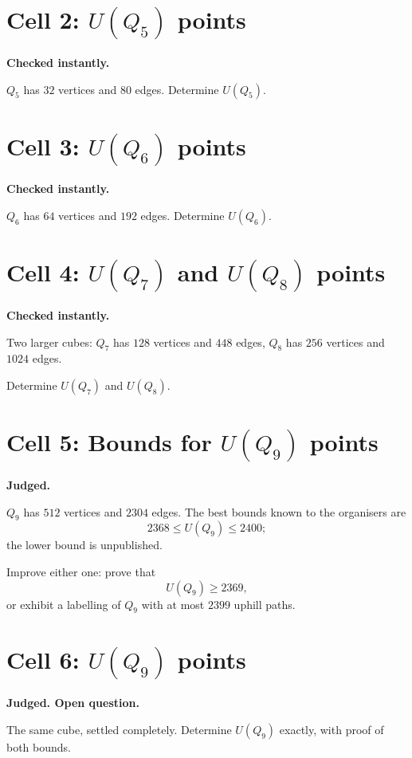 \documentclass[11pt]{article}
\theoremstyle{definition}
\newcommand{\cell}[3]{%
  \section*{Cell #1: #2\hfill{\normalsize\mdseries #3}}}
\begin{document}
\cell{2}{$U(Q_5)$}{2 points}

\textbf{Checked instantly.}

$Q_5$ has $32$ vertices and $80$ edges. Determine $U(Q_5)$.

\cell{3}{$U(Q_6)$}{3 points}

\textbf{Checked instantly.}

$Q_6$ has $64$ vertices and $192$ edges. Determine $U(Q_6)$.

\cell{4}{$U(Q_7)$ and $U(Q_8)$}{5 points}

\textbf{Checked instantly.}

Two larger cubes: $Q_7$ has $128$ vertices and $448$ edges, $Q_8$ has
$256$ vertices and $1024$ edges.

Determine $U(Q_7)$ and $U(Q_8)$.

\cell{5}{Bounds for $U(Q_9)$}{8 points}

\textbf{Judged.}

$Q_9$ has $512$ vertices and $2304$ edges. The best bounds known to
the organisers are
\[
  2368 \leq U(Q_9) \leq 2400;
\]
the lower bound is unpublished.

Improve either one: prove that
\[
  U(Q_9) \geq 2369,
\]
or exhibit a labelling of $Q_9$ with at most $2399$ uphill paths.

\cell{6}{$U(Q_9)$}{13 points}

\textbf{Judged. Open question.}

The same cube, settled completely. Determine $U(Q_9)$ exactly, with
proof of both bounds.
\end{document}
